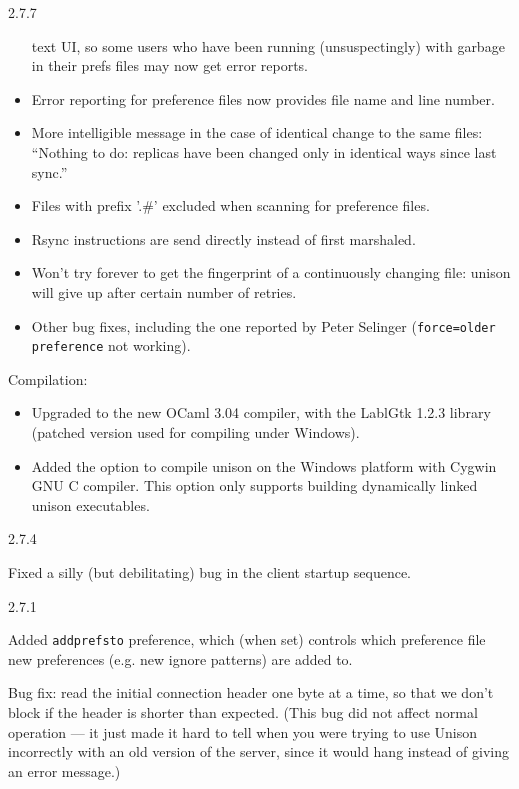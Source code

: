 \begin{changesfromversion}{2.7.7}
\begin{itemize}
    text UI, so some users who have been running (unsuspectingly) with
    garbage in their prefs files may now get error reports.
  \item Error reporting for preference files now provides file name and
    line number.
  \item More intelligible message in the case of identical change to the same
    files: ``Nothing to do: replicas have been changed only in identical
    ways since last sync.''
  \item Files with prefix '.\#' excluded when scanning for preference
    files.
  \item Rsync instructions are send directly instead of first
    marshaled.
  \item Won't try forever to get the fingerprint of a continuously changing file:
    unison will give up after certain number of retries.
  \item Other bug fixes, including the one reported by Peter Selinger
    (\verb|force=older preference| not working).
  \end{itemize}
\item Compilation:
  \begin{itemize}
  \item Upgraded to the new OCaml 3.04 compiler, with the LablGtk
    1.2.3 library (patched version used for compiling under Windows).
  \item Added the option to compile unison on the Windows platform with
    Cygwin GNU C compiler.  This option only supports building
    dynamically linked unison executables.
  \end{itemize}
\end{changesfromversion}

\begin{changesfromversion}{2.7.4}
\item Fixed a silly (but debilitating) bug in the client startup sequence.
\end{changesfromversion}

\begin{changesfromversion}{2.7.1}
\item Added \verb|addprefsto| preference, which (when set) controls which
preference file new preferences (e.g. new ignore patterns) are added to.
\item Bug fix: read the initial connection header one byte at a time, so
that we don't block if the header is shorter than expected.  (This bug
did not affect normal operation --- it just made it hard to tell when you
were trying to use Unison incorrectly with an old version of the server,
since it would hang instead of giving an error message.)
\end{changesfromversion}


